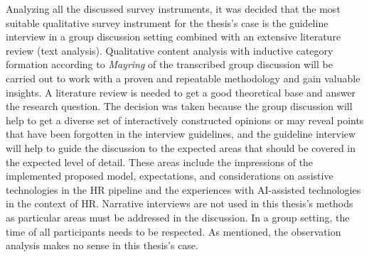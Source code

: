 \documentclass[draft,final]{thesisclass} %
\begin{document}
Analyzing all the discussed survey instruments, it was decided that the most suitable qualitative survey instrument for the thesis's case is the guideline interview in a group discussion setting combined with an extensive literature review (text analysis).
Qualitative content analysis with inductive category formation according to \textit{Mayring} \parencite{mayring} of the transcribed group discussion will be carried out to work with a proven and repeatable methodology and gain valuable insights.
A literature review is needed to get a good theoretical base and answer the research question.
The decision was taken because the group discussion will help to get a diverse set of interactively constructed opinions or may reveal points that have been forgotten in the interview guidelines, and the guideline interview will help to guide the discussion to the expected areas that should be covered in the expected level of detail.
These areas include the impressions of the implemented proposed model, expectations, and considerations on assistive technologies in the \acs{HR} pipeline and the experiences with \acs{AI}-assisted technologies in the context of \acs{HR}.
Narrative interviews are not used in this thesis's methods as particular areas must be addressed in the discussion. In a group setting, the time of all participants needs to be respected.
As mentioned, the observation analysis makes no sense in this thesis's case.
\end{document}
